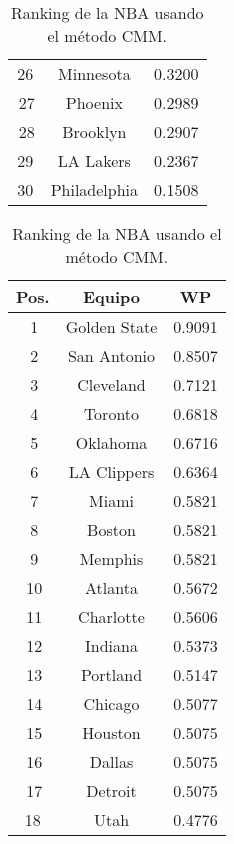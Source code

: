 \documentclass[a4paper]{article}
\newcommand{\bigfatgreen}{\begin{tikzpicture}[x=0.5pt,y=0.6pt,yscale=-.5,xscale=.5]
\draw  [fill=ForestGreen!70,fill opacity=1] (100,123.22) -- (113.25,113) -- (126.5,123.22) -- (119.88,123.22) -- (119.88,138.54) -- (106.63,138.54) -- (106.63,123.22) -- cycle ;
\end{tikzpicture}}
\newcommand{\bigfatred}{\begin{tikzpicture}[x=0.5pt,y=0.6pt,yscale=-.5,xscale=.5, rotate= 180]
\draw  [fill=red!70,fill opacity=1] (100,123.22) -- (113.25,113) -- (126.5,123.22) -- (119.88,123.22) -- (119.88,138.54) -- (106.63,138.54) -- (106.63,123.22) -- cycle ;
\end{tikzpicture}}
\begin{document}
\begin{table}[h]
{\begin{subtable}{0.33\textwidth}
\begin{tabular}{|c|c|c|}
                26 & Minnesota & 0.3200 \\
                \bigfatgreen\,27 & Phoenix & 0.2989 \\
                \bigfatred\,28 & Brooklyn & 0.2907 \\
                29 & LA Lakers & 0.2367 \\
                30 & Philadelphia & 0.1508 \\
                \hline
            \end{tabular}
            \caption{Ranking de la NBA usando el m\'etodo CMM.}
            \label{subtab:NBA_CMM}
        \end{subtable}%
        \begin{subtable}{0.33\textwidth}
            \centering
            \begin{tabular}{|c|c|c|}
                \hline
            	Pos. & Equipo & WP\\
            	\hline
                \bigfatgreen\,1 & Golden State & 0.9091 \\
                \bigfatgreen\,2 & San Antonio & 0.8507 \\
                \bigfatred\,3 & Cleveland & 0.7121 \\
                \bigfatred\,4 & Toronto & 0.6818 \\
                \bigfatred\,5 & Oklahoma & 0.6716 \\
                \bigfatgreen\,6 & LA Clippers & 0.6364 \\
                \bigfatred\,7 & Miami & 0.5821 \\
                \bigfatgreen\,8 & Boston & 0.5821 \\
                \bigfatgreen\,9 & Memphis & 0.5821 \\
                \bigfatred\,10 & Atlanta & 0.5672 \\
                \bigfatred\,11 & Charlotte & 0.5606\\
                \bigfatred\,12 & Indiana & 0.5373 \\
                \bigfatred\,13 & Portland & 0.5147 \\
                \bigfatgreen\,14 & Chicago & 0.5077 \\
                \bigfatred\,15 & Houston & 0.5075 \\
                \bigfatred\,16 & Dallas &  0.5075 \\
                \bigfatred\,17 & Detroit & 0.5075 \\
                18 & Utah & 0.4776 \\

\end{tabular}
\end{subtable}}
\end{table}
\end{document}
